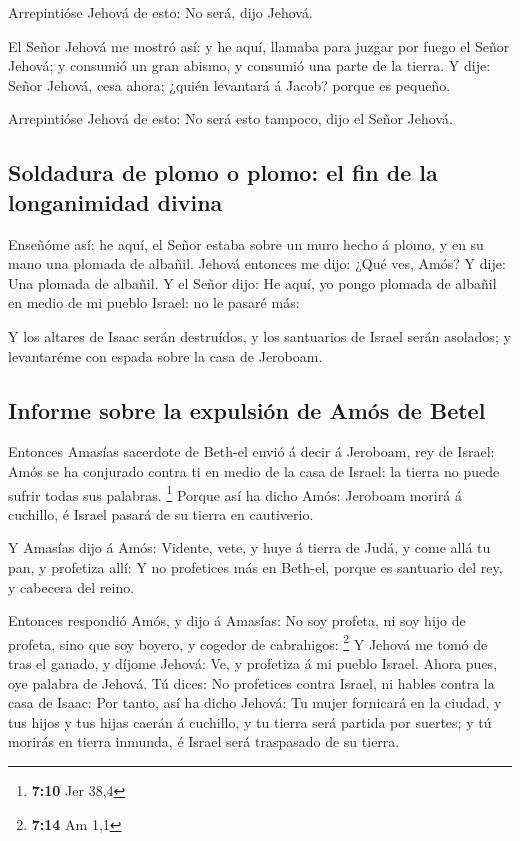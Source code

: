  Arrepintióse Jehová de esto: No será, dijo Jehová.

 El Señor Jehová me mostró así: y he aquí, llamaba para
juzgar por fuego el Señor Jehová; y consumió un gran abismo, y consumió
una parte de la tierra.  Y dije: Señor Jehová, cesa ahora;
¿quién levantará á Jacob? porque es pequeño.

 Arrepintióse Jehová de esto: No será esto tampoco, dijo el
Señor Jehová.

\hypertarget{soldadura-de-plomo-o-plomo-el-fin-de-la-longanimidad-divina}{%
\subsection{Soldadura de plomo o plomo: el fin de la longanimidad
divina}\label{soldadura-de-plomo-o-plomo-el-fin-de-la-longanimidad-divina}}

 Enseñóme así: he aquí, el Señor estaba sobre un muro hecho
á plomo, y en su mano una plomada de albañil.  Jehová
entonces me dijo: ¿Qué ves, Amós? Y dije: Una plomada de albañil. Y el
Señor dijo: He aquí, yo pongo plomada de albañil en medio de mi pueblo
Israel: no le pasaré más:

 Y los altares de Isaac serán destruídos, y los santuarios
de Israel serán asolados; y levantaréme con espada sobre la casa de
Jeroboam.

\hypertarget{informe-sobre-la-expulsiuxf3n-de-amuxf3s-de-betel}{%
\subsection{Informe sobre la expulsión de Amós de
Betel}\label{informe-sobre-la-expulsiuxf3n-de-amuxf3s-de-betel}}

 Entonces Amasías sacerdote de Beth-el envió á decir á
Jeroboam, rey de Israel: Amós se ha conjurado contra ti en medio de la
casa de Israel: la tierra no puede sufrir todas sus palabras.
\footnote{\textbf{7:10} Jer 38,4}  Porque así ha dicho
Amós: Jeroboam morirá á cuchillo, é Israel pasará de su tierra en
cautiverio.

 Y Amasías dijo á Amós: Vidente, vete, y huye á tierra de
Judá, y come allá tu pan, y profetiza allí:  Y no
profetices más en Beth-el, porque es santuario del rey, y cabecera del
reino.

 Entonces respondió Amós, y dijo á Amasías: No soy profeta,
ni soy hijo de profeta, sino que soy boyero, y cogedor de cabrahigos:
\footnote{\textbf{7:14} Am 1,1}  Y Jehová me tomó de tras
el ganado, y díjome Jehová: Ve, y profetiza á mi pueblo Israel.
 Ahora pues, oye palabra de Jehová. Tú dices: No profetices
contra Israel, ni hables contra la casa de Isaac:  Por
tanto, así ha dicho Jehová: Tu mujer fornicará en la ciudad, y tus hijos
y tus hijas caerán á cuchillo, y tu tierra será partida por suertes; y
tú morirás en tierra inmunda, é Israel será traspasado de su tierra.

